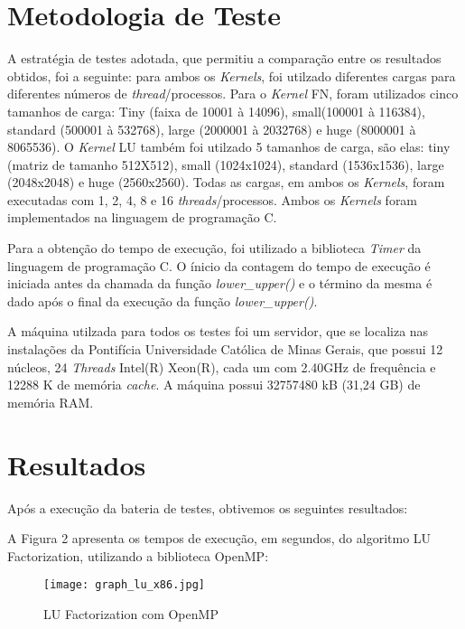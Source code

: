 \documentclass[12pt]{article}
\begin{document}
\section{Metodologia de Teste}
A estratégia de testes adotada, que permitiu a comparação entre os resultados obtidos, foi a seguinte: para ambos os \textit{Kernels}, foi utilzado diferentes cargas para diferentes números de \textit{thread}/processos. Para o \textit{Kernel} FN, foram utilizados cinco tamanhos de carga: Tiny (faixa de 10001 à 14096), small(100001 à 116384), standard (500001 à 532768), large (2000001 à 2032768) e huge (8000001 à 8065536). O \textit{Kernel} LU também foi utilzado 5 tamanhos de carga, são elas: tiny (matriz de tamanho 512X512), small (1024x1024), standard (1536x1536), large (2048x2048) e huge (2560x2560). Todas as cargas, em ambos os \textit{Kernels}, foram executadas com 1, 2, 4, 8 e 16 \textit{threads}/processos. Ambos os \textit{Kernels} foram implementados na linguagem de programação C.

Para a obtenção do tempo de execução, foi utilizado a biblioteca \textit{Timer} da linguagem de programação C. O ínicio da contagem do tempo de execução é iniciada antes da chamada da função \textit{lower\_upper()} e o término da mesma é dado após o final da execução da função \textit{lower\_upper()}.

A máquina utilzada para todos os testes foi um servidor, que se localiza nas instalações da Pontifícia Universidade Católica de Minas Gerais, que possui 12 núcleos, 24 \textit{Threads} Intel(R) Xeon(R), cada um com 2.40GHz de frequência e 12288 K de memória \textit{cache}. A máquina possui 32757480 kB (31,24 GB) de memória RAM. 



\section{Resultados}
Após a execução da bateria de testes, obtivemos os seguintes resultados:


A Figura 2 apresenta os tempos de execução, em segundos, do algoritmo LU Factorization, utilizando a biblioteca OpenMP:

\begin{figure}[h!]
  \centering
  \texttt{[image: graph\_lu\_x86.jpg]}
  \caption{LU Factorization com OpenMP}
  \label{fig:FN OpenMP}
\end{figure}
\end{document}
